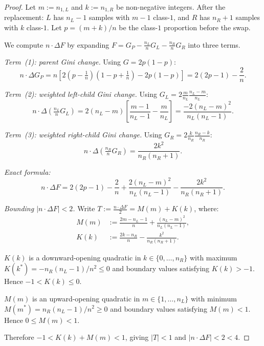 \documentclass[10pt,a4paper]{amsart}
\begin{document}
\begin{proof}
Let $m := n_{1,L}$ and $k := n_{1,R}$ be non-negative integers.
After the replacement: $L$ has $n_L-1$ samples with $m-1$ class-$1$,
and $R$ has $n_R+1$ samples with $k$ class-$1$.
Let $p = (m+k)/n$ be the class-$1$ proportion before the swap.

We compute $n\cdot\Delta F$ by expanding
$F = G_P - \frac{n_L}{n}G_L - \frac{n_R}{n}G_R$ into three terms.

\textit{Term~(1): parent Gini change.}
Using $G = 2p(1-p)$:
\[
  n\cdot\Delta G_P
  = n\!\left[2\!\left(p-\tfrac{1}{n}\right)\!\left(1-p+\tfrac{1}{n}\right) - 2p(1-p)\right]
  = 2(2p-1) - \frac{2}{n}.
\]

\textit{Term~(2): weighted left-child Gini change.}
Using $G_L = 2\frac{m}{n_L}\frac{n_L-m}{n_L}$:
\[
  n\cdot\Delta\!\left(\tfrac{n_L}{n}G_L\right)
  = 2(n_L-m)\!\left[\frac{m-1}{n_L-1} - \frac{m}{n_L}\right]
  = \frac{-2(n_L-m)^2}{n_L(n_L-1)}.
\]

\textit{Term~(3): weighted right-child Gini change.}
Using $G_R = 2\frac{k}{n_R}\frac{n_R-k}{n_R}$:
\[
  n\cdot\Delta\!\left(\tfrac{n_R}{n}G_R\right) = \frac{2k^2}{n_R(n_R+1)}.
\]

\textit{Exact formula:}
\begin{equation}
  n\cdot\Delta F
  = 2(2p-1) - \frac{2}{n}
    + \frac{2(n_L-m)^2}{n_L(n_L-1)}
    - \frac{2k^2}{n_R(n_R+1)}.
  \label{eq:caseB-exact}
\end{equation}

\textit{Bounding $|n\cdot\Delta F| < 2$.}
Write $T := \frac{n\cdot\Delta F}{2} = M(m) + K(k)$, where:
\begin{align}
  M(m) &:= \frac{2m-n_L-1}{n} + \frac{(n_L-m)^2}{n_L(n_L-1)}, \\
  K(k) &:= \frac{2k-n_R}{n} - \frac{k^2}{n_R(n_R+1)}.
\end{align}

$K(k)$ is a downward-opening quadratic in $k \in \{0,\ldots,n_R\}$
with maximum $K(k^*) = -n_R(n_L-1)/n^2 \leq 0$ and boundary values
satisfying $K(k) > -1$. Hence $-1 < K(k) \leq 0$.

$M(m)$ is an upward-opening quadratic in $m \in \{1,\ldots,n_L\}$
with minimum $M(m^*) = n_R(n_L-1)/n^2 \geq 0$ and boundary values
satisfying $M(m) < 1$. Hence $0 \leq M(m) < 1$.

Therefore $-1 < K(k) + M(m) < 1$, giving
$|T| < 1$ and $|n\cdot\Delta F| < 2 < 4$.
\end{proof}
\end{document}
